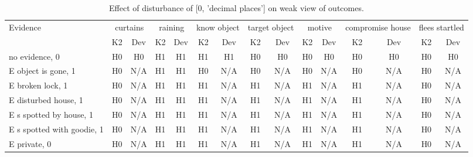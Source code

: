 \begin{table}\begin{tabular}{l|cc|cc|cc|cc|cc|cc|cc}\toprule\multirow{2}{*}{Evidence} & \multicolumn{2}{c}{curtains}& \multicolumn{2}{c}{raining}& \multicolumn{2}{c}{know object}& \multicolumn{2}{c}{target object}& \multicolumn{2}{c}{motive}& \multicolumn{2}{c}{compromise house}& \multicolumn{2}{c}{flees startled}\\& {K2} & {Dev}& {K2} & {Dev}& {K2} & {Dev}& {K2} & {Dev}& {K2} & {Dev}& {K2} & {Dev}& {K2} & {Dev}\\\midrule
no evidence, 0 & H0&H0&H1&H1&H1&H1&H0&H0&H0&H0&H0&H0&H0&H0\\E object is gone, 1 & \cellcolor{Bittersweet}H0&\cellcolor{Bittersweet}N/A&H1&H1&\cellcolor{Bittersweet}H0&\cellcolor{Bittersweet}N/A&\cellcolor{Bittersweet}H0&\cellcolor{Bittersweet}N/A&\cellcolor{Bittersweet}H0&\cellcolor{Bittersweet}N/A&\cellcolor{Bittersweet}H0&\cellcolor{Bittersweet}N/A&\cellcolor{Bittersweet}H0&\cellcolor{Bittersweet}N/A\\E broken lock, 1 & \cellcolor{Bittersweet}H0&\cellcolor{Bittersweet}N/A&H1&H1&\cellcolor{Bittersweet}H1&\cellcolor{Bittersweet}N/A&\cellcolor{Bittersweet}H1&\cellcolor{Bittersweet}N/A&\cellcolor{Bittersweet}H1&\cellcolor{Bittersweet}N/A&\cellcolor{Bittersweet}H1&\cellcolor{Bittersweet}N/A&\cellcolor{Bittersweet}H0&\cellcolor{Bittersweet}N/A\\E disturbed house, 1 & \cellcolor{Bittersweet}H0&\cellcolor{Bittersweet}N/A&H1&H1&\cellcolor{Bittersweet}H1&\cellcolor{Bittersweet}N/A&\cellcolor{Bittersweet}H1&\cellcolor{Bittersweet}N/A&\cellcolor{Bittersweet}H1&\cellcolor{Bittersweet}N/A&\cellcolor{Bittersweet}H1&\cellcolor{Bittersweet}N/A&\cellcolor{Bittersweet}H0&\cellcolor{Bittersweet}N/A\\E s spotted by house, 1 & \cellcolor{Bittersweet}H0&\cellcolor{Bittersweet}N/A&H1&H1&\cellcolor{Bittersweet}H1&\cellcolor{Bittersweet}N/A&\cellcolor{Bittersweet}H1&\cellcolor{Bittersweet}N/A&\cellcolor{Bittersweet}H1&\cellcolor{Bittersweet}N/A&\cellcolor{Bittersweet}H1&\cellcolor{Bittersweet}N/A&\cellcolor{Bittersweet}H0&\cellcolor{Bittersweet}N/A\\E s spotted with goodie, 1 & \cellcolor{Bittersweet}H0&\cellcolor{Bittersweet}N/A&H1&H1&\cellcolor{Bittersweet}H1&\cellcolor{Bittersweet}N/A&\cellcolor{Bittersweet}H1&\cellcolor{Bittersweet}N/A&\cellcolor{Bittersweet}H1&\cellcolor{Bittersweet}N/A&\cellcolor{Bittersweet}H1&\cellcolor{Bittersweet}N/A&\cellcolor{Bittersweet}H0&\cellcolor{Bittersweet}N/A\\E private, 0 & \cellcolor{Bittersweet}H0&\cellcolor{Bittersweet}N/A&H1&H1&\cellcolor{Bittersweet}H1&\cellcolor{Bittersweet}N/A&\cellcolor{Bittersweet}H1&\cellcolor{Bittersweet}N/A&\cellcolor{Bittersweet}H1&\cellcolor{Bittersweet}N/A&\cellcolor{Bittersweet}H1&\cellcolor{Bittersweet}N/A&\cellcolor{Bittersweet}H0&\cellcolor{Bittersweet}N/A\\\bottomrule\end{tabular}\caption{Effect of disturbance of [0, 'decimal places'] on weak view of outcomes.}\end{table}